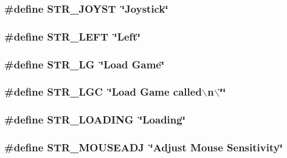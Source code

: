 \hypertarget{FOREIGN_8H_aac3ed17b937cedec36c2b389b62cfa66}{
\subsubsection[{STR\_\-JOYST}]{\setlength{\rightskip}{0pt plus 5cm}\#define STR\_\-JOYST~\char`\"{}Joystick\char`\"{}}}
\label{FOREIGN_8H_aac3ed17b937cedec36c2b389b62cfa66}
\hypertarget{FOREIGN_8H_a275bf4a945109f750effc30403a72895}{
\subsubsection[{STR\_\-LEFT}]{\setlength{\rightskip}{0pt plus 5cm}\#define STR\_\-LEFT~\char`\"{}Left\char`\"{}}}
\label{FOREIGN_8H_a275bf4a945109f750effc30403a72895}
\hypertarget{FOREIGN_8H_adaa32f309c8f2f981c2ff92d733f895e}{
\subsubsection[{STR\_\-LG}]{\setlength{\rightskip}{0pt plus 5cm}\#define STR\_\-LG~\char`\"{}Load Game\char`\"{}}}
\label{FOREIGN_8H_adaa32f309c8f2f981c2ff92d733f895e}
\hypertarget{FOREIGN_8H_ab9a5a6011a46a4b2cd1b3065536cbab4}{
\subsubsection[{STR\_\-LGC}]{\setlength{\rightskip}{0pt plus 5cm}\#define STR\_\-LGC~\char`\"{}Load Game called$\backslash$n$\backslash$\char`\"{}\char`\"{}}}
\label{FOREIGN_8H_ab9a5a6011a46a4b2cd1b3065536cbab4}
\hypertarget{FOREIGN_8H_ad47027c8badadc57caada27cfc75c97c}{
\subsubsection[{STR\_\-LOADING}]{\setlength{\rightskip}{0pt plus 5cm}\#define STR\_\-LOADING~\char`\"{}Loading\char`\"{}}}
\label{FOREIGN_8H_ad47027c8badadc57caada27cfc75c97c}
\hypertarget{FOREIGN_8H_a24089f18d52979d101c27f9a76f17758}{
\subsubsection[{STR\_\-MOUSEADJ}]{\setlength{\rightskip}{0pt plus 5cm}\#define STR\_\-MOUSEADJ~\char`\"{}Adjust Mouse Sensitivity\char`\"{}}}
